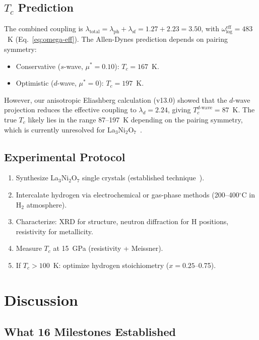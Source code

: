 \documentclass[aps,prb,reprint,superscriptaddress,longbibliography]{revtex4-2}
\begin{document}
\subsection{$T_c$ Prediction}

The combined coupling is $\lambda_{\mathrm{total}} = \lambda_{\mathrm{ph}} + \lambda_{\mathrm{sf}} = 1.27 + 2.23 = 3.50$, with $\omega_{\log}^{\mathrm{eff}} = 483$~K (Eq.~\ref{eq:omega-eff}). The Allen-Dynes prediction depends on pairing symmetry:
\begin{itemize}
    \item Conservative ($s$-wave, $\mu^* = 0.10$): $T_c = 167$~K.
    \item Optimistic ($d$-wave, $\mu^* = 0$): $T_c = 197$~K.
\end{itemize}
However, our anisotropic Eliashberg calculation (v13.0) showed that the $d$-wave projection reduces the effective coupling to $\lambda_d = 2.24$, giving $T_c^{d\text{-wave}} = 87$~K. The true $T_c$ likely lies in the range 87--197~K depending on the pairing symmetry, which is currently unresolved for La$_3$Ni$_2$O$_7$~\cite{Wang2025nickelate}.

\subsection{Experimental Protocol}

\begin{enumerate}
    \item Synthesize La$_3$Ni$_2$O$_7$ single crystals (established technique~\cite{Wang2025nickelate}).
    \item Intercalate hydrogen via electrochemical or gas-phase methods (200--400$^\circ$C in H$_2$ atmosphere).
    \item Characterize: XRD for structure, neutron diffraction for H positions, resistivity for metallicity.
    \item Measure $T_c$ at 15~GPa (resistivity + Meissner).
    \item If $T_c > 100$~K: optimize hydrogen stoichiometry ($x = 0.25$--0.75).
\end{enumerate}

\section{Discussion}
\label{sec:discussion}

\subsection{What 16 Milestones Established}
\end{document}
